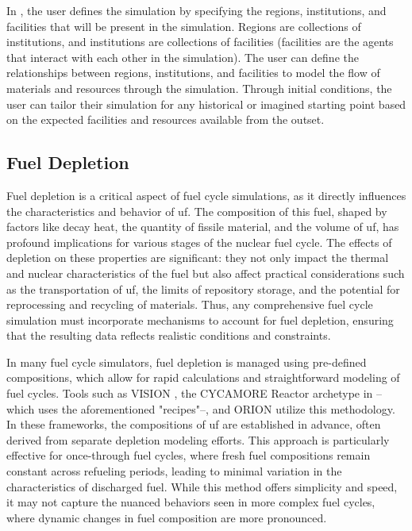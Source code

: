 
In \cyclus, the user defines the simulation by specifying the regions, institutions, and facilities that will be present in the simulation. Regions are collections of institutions, and institutions are collections of facilities (facilities are the agents that interact with each other in the simulation). The user can define the relationships between regions, institutions, and facilities to model the flow of materials and resources through the simulation. Through initial conditions, the user can tailor their simulation for any historical or imagined starting point based on the expected facilities and resources available from the outset.

\subsection{Fuel Depletion}
\label{sec:depletion}

Fuel depletion is a critical aspect of fuel cycle simulations, as it directly influences the characteristics and behavior of \gls{uf}. The composition of this fuel, shaped by factors like decay heat, the quantity of fissile material, and the volume of \gls{uf}, has profound implications for various stages of the nuclear fuel cycle. The effects of depletion on these properties are significant: they not only impact the thermal and nuclear characteristics of the fuel but also affect practical considerations such as the transportation of \gls{uf}, the limits of repository storage, and the potential for reprocessing and recycling of materials. Thus, any comprehensive fuel cycle simulation must incorporate mechanisms to account for fuel depletion, ensuring that the resulting data reflects realistic conditions and constraints.

In many fuel cycle simulators, fuel depletion is managed using pre-defined compositions, which allow for rapid calculations and straightforward modeling of fuel cycles. Tools such as VISION \cite{yacout_visionverifiable_2006}, the CYCAMORE Reactor archetype in \cyclus--which uses the aforementioned "recipes"--, and ORION utilize this methodology. In these frameworks, the compositions of \gls{uf} are established in advance, often derived from separate depletion modeling efforts. This approach is particularly effective for once-through fuel cycles, where fresh fuel compositions remain constant across refueling periods, leading to minimal variation in the characteristics of discharged fuel. While this method offers simplicity and speed, it may not capture the nuanced behaviors seen in more complex fuel cycles, where dynamic changes in fuel composition are more pronounced.

